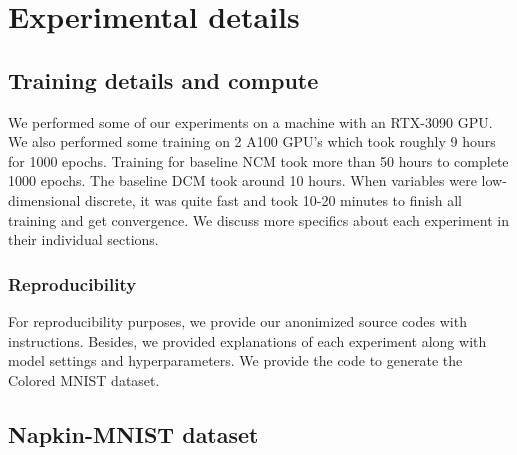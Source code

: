 \documentclass{article}
\newcommand{\Do}{\text{do}}
\theoremstyle{plain}
\theoremstyle{definition}
\theoremstyle{remark}
\begin{document}

	

 

 \section{Experimental details}
	\label{appex:exp-details}


\subsection{{Training details and compute}}
\label{appex-comput-resource}
We performed some of our experiments on a machine with an RTX-3090 GPU. We also performed some training on 2 A100 GPU's  which took roughly 9 hours for 1000 epochs. Training for baseline NCM took more than 50 hours to complete 1000 epochs. The baseline DCM took around 10 hours. When variables were low-dimensional discrete, it was quite fast and took 10-20 minutes to finish all training and get convergence. We discuss more specifics about each experiment in their individual sections.

 \subsubsection{Reproducibility }
 \label{appex-reproduce}
 For reproducibility purposes, we provide our anonimized source codes with instructions. Besides, we provided explanations of each experiment along with model settings and hyperparameters. We provide the code to generate the Colored MNIST dataset.
	
	
	\subsection{Napkin-MNIST dataset}
	\label{appex:napkin-mnist}
	
\end{document}
